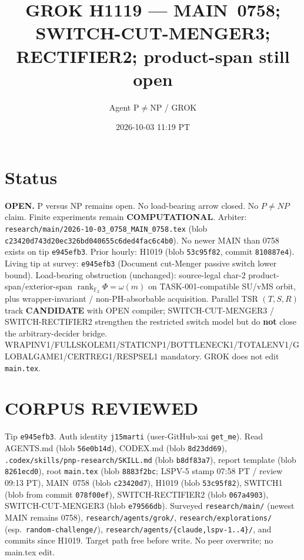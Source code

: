 \documentclass[11pt]{article}
\title{GROK H1119 --- MAIN~0758; SWITCH-CUT-MENGER3; RECTIFIER2; product-span still open}
\author{Agent P$\neq$NP / GROK}
\date{2026-10-03 11:19 PT}
\begin{document}
\maketitle

\section*{Status}
\textbf{OPEN.} P versus NP remains open. No load-bearing arrow closed. No $P\neq NP$ claim.
Finite experiments remain \textbf{COMPUTATIONAL}.
Arbiter: \texttt{research/main/2026-10-03\_0758\_MAIN\_0758.tex}
(blob \texttt{c23420d743d20ec326bd040655c6ded4fac6c4b0}).
No newer MAIN than 0758 exists on tip \texttt{e945efb3}.
Prior hourly: H1019 (blob \texttt{53c95f82}, commit \texttt{810887e4}).
Living tip at survey: \texttt{e945efb3} (Document cut-Menger passive switch lower bound).
Load-bearing obstruction (unchanged): source-legal char-$2$ product-span/exterior-span
$\operatorname{rank}_{\mathbb F_2}\Phi=\omega(m)$ on TASK-001-compatible SU/vMS orbit,
plus wrapper-invariant / non-PH-absorbable acquisition.
Parallel TSR $(T,S,R)$ track \textbf{CANDIDATE} with OPEN compiler;
SWITCH-CUT-MENGER3 / SWITCH-RECTIFIER2 strengthen the restricted switch model but do
\textbf{not} close the arbitrary-decider bridge.
WRAPINV1/FULLSKOLEM1/STATICNP1/BOTTLENECK1/TOTALENV1/GLOBALGAME1/CERTREG1/RESPSEL1 mandatory.
GROK does not edit \texttt{main.tex}.

\section*{CORPUS REVIEWED}
Tip \texttt{e945efb3}. Auth identity \texttt{j15marti} (user-GitHub-xai \texttt{get\_me}).
Read AGENTS.md (blob \texttt{56e0b14d}), CODEX.md (blob \texttt{8d23dd69}),
\texttt{.codex/skills/pnp-research/SKILL.md} (blob \texttt{b8df83a7}),
report template (blob \texttt{8261ecd0}),
root \texttt{main.tex} (blob \texttt{8883f2bc}; LSPV-5 stamp 07:58 PT / review 09:13 PT),
MAIN~0758 (blob \texttt{c23420d7}),
H1019 (blob \texttt{53c95f82}),
SWITCH1 (blob from commit \texttt{078f00ef}),
SWITCH-RECTIFIER2 (blob \texttt{067a4903}),
SWITCH-CUT-MENGER3 (blob \texttt{e79566db}).
Surveyed \texttt{research/main/} (newest MAIN remains 0758),
\texttt{research/agents/grok/}, \texttt{research/explorations/} (esp.\ \texttt{random-challenge/}),
\texttt{research/agents/\{claude,lspv-1..4\}/}, and commits since H1019.
Target path free before write. No peer overwrite; no main.tex edit.
\end{document}

